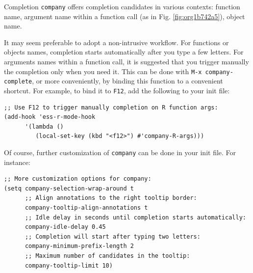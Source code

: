 \documentclass[presentation]{beamer}
\begin{document}
\begin{frame}[fragile,allowframebreaks,label=]{Completion}
\texttt{company} offers completion candidates in various contexts: function name, argument name within a function call (as in Fig. \ref{fig:org1b742a5}), object name.

It may seem preferable to adopt a non-intrusive workflow. For functions or objects names, completion starts automatically after you type a few letters. For arguments names within a function call, it is suggested that you trigger manually the completion only when you need it. This can be done with \texttt{M-x company-complete}, or more conveniently, by binding this function to a convenient shortcut. For example, to bind it to \texttt{F12}, add the following to your init file:

\begin{verbatim}
;; Use F12 to trigger manually completion on R function args:
(add-hook 'ess-r-mode-hook
	  '(lambda ()
	     (local-set-key (kbd "<f12>") #'company-R-args)))
\end{verbatim}

\pagebreak

Of course, further customization of \texttt{company} can be done in your init file. For instance:

\begin{verbatim}
;; More customization options for company:
(setq company-selection-wrap-around t
      ;; Align annotations to the right tooltip border:
      company-tooltip-align-annotations t
      ;; Idle delay in seconds until completion starts automatically:
      company-idle-delay 0.45
      ;; Completion will start after typing two letters:
      company-minimum-prefix-length 2
      ;; Maximum number of candidates in the tooltip:
      company-tooltip-limit 10)
\end{verbatim}
\end{frame}
\end{document}
